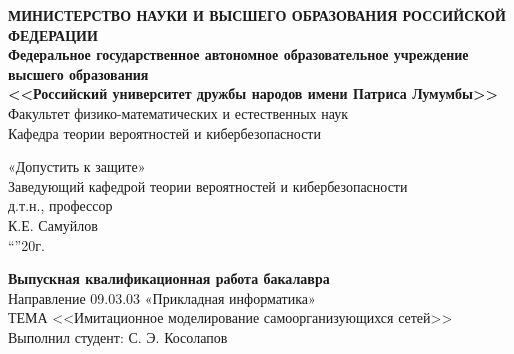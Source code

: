 \begin{titlepage}
  
  \begin{center}
    \textbf{МИНИСТЕРСТВО НАУКИ И ВЫСШЕГО ОБРАЗОВАНИЯ %
      РОССИЙСКОЙ ФЕДЕРАЦИИ\\
      Федеральное государственное автономное образовательное
      учреждение высшего образования\\
      <<Российский университет дружбы народов имени Патриса Лумумбы>>}\\[5mm]
    Факультет физико-математических и естественных наук \\[2mm]
    Кафедра теории вероятностей и кибербезопасности

    \vfill

    \hfill
    \begin{minipage}{.5\textwidth}
      «Допустить к защите» \\ [2mm]
      Заведующий кафедрой теории вероятностей и кибербезопасности \\[2mm]
      д.т.н., профессор  \\[2mm]
      \underline{\hspace{3cm}} К.Е. Самуйлов \\
      ``\underline{\hspace{1cm}}''\underline{\hspace{3cm}}20\underline{\hspace{1cm}}г.
    \end{minipage}%

    \vfill

    \textbf{Выпускная квалификационная работа бакалавра} \\[3mm]

    Направление
    09.03.03 «Прикладная информатика»\\ [3mm]
  
    ТЕМА <<Имитационное моделирование самоорганизующихся сетей>>\\[3mm]

    Выполнил студент: С. Э. Косолапов
  \end{center}



\end{titlepage}
